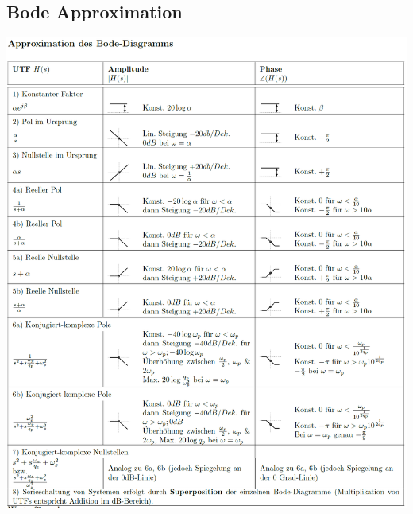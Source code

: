   \subsection{Bode Approximation}
    \begin{center}
      \includegraphics[width=16cm]{./images/BodeAproximationen.png}
    \end{center} 
  
